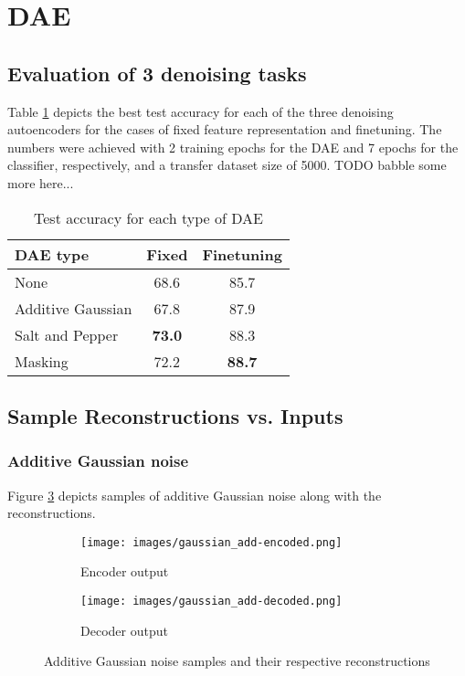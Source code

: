 \documentclass[10pt, a4paper]{article}
\title{\mytitle}
\author{\myauthor\hspace{1em}\\\contact\\University of Bern\hspace{0.5em}-\hspace{0.5em}\mymodule}
\date{}
\begin{document}
	\maketitle
    
	\section{DAE}
    \subsection{Evaluation of 3 denoising tasks}
    Table \ref{table:ta} depicts the best test accuracy for each of the three denoising autoencoders for the cases of fixed feature representation and finetuning. The numbers were achieved with 2 training epochs for the DAE and 7 epochs for the classifier, respectively, and a transfer dataset size of 5000.
    TODO babble some more here...
    
    \begin{table}[h]
    \begin{center}
    \begin{tabular}{|l|c|c|}
    \hline
    DAE type & Fixed & Finetuning \\
    \hline\hline
    None & 68.6 & 85.7 \\
    Additive Gaussian & 67.8 & 87.9 \\
    Salt and Pepper & \textbf{73.0} & 88.3 \\
    Masking & 72.2 & \textbf{88.7} \\
    \hline
    \end{tabular}
    \end{center}
    \caption{Test accuracy for each type of DAE}
    \label{table:ta}
    \end{table}
    
    \subsection{Sample Reconstructions vs. Inputs}
    \subsubsection{Additive Gaussian noise}
    Figure \ref{fig:figag} depicts samples of additive Gaussian noise along with the reconstructions.
    
    \begin{figure}[h]
    \begin{subfigure}{0.2\textwidth}
    \texttt{[image: images/gaussian\_add-encoded.png]} 
    \caption{Encoder output}
    \label{fig:subim1}
    \end{subfigure}
    \begin{subfigure}{0.2\textwidth}
    \texttt{[image: images/gaussian\_add-decoded.png]}
    \caption{Decoder output}
    \label{fig:subim2}
    \end{subfigure}
    \caption{Additive Gaussian noise samples and their respective reconstructions}
    \label{fig:figag}
    \end{figure}
    
\end{document}
